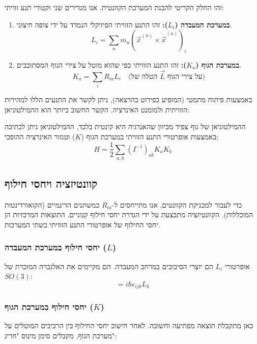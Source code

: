 זהו החלק הקריטי להבנת המערכת הקוונטית. אנו מגדירים שני וקטורי תנע זוויתי:

\begin{enumerate}
    \item \textbf{במערכת המעבדה ($L_i$):} זהו התנע הזוויתי הפיזיקלי הנמדד על ידי צופה חיצוני.
    \begin{equation}
        L_i = \sum_n m_n (\vec{x}^{(n)} \times \dot{\vec{x}}^{(n)})_i
    \end{equation}
    \item \textbf{במערכת הגוף ($K_a$):} זהו התנע הזוויתי כפי שהוא מוטל על צירי הגוף המסתובבים.
    \begin{equation}
        K_a = \sum_i R_{ia} L_i \quad \text{(הטלה של } \vec{L} \text{ על צירי הגוף)}
    \end{equation}
\end{enumerate}

באמצעות פיתוח מתמטי (המופיע בפירוט בהרצאה), ניתן לקשר את התנעים הללו למהירות הזוויתית ולמומנט האינרציה. הקשר החשוב ביותר הוא ההמילטוניאן:

\begin{resultbox}{ההמילטוניאן של גוף צפיד}
מכיוון שהאנרגיה היא קינטית בלבד, ההמילטוניאן ניתן לכתיבה באמצעות אופרטורי התנע הזוויתי במערכת הגוף ($K$) וטנזור האינרציה ההופכי:
\begin{equation}
    H = \frac{1}{2} \sum_{a,b} (I^{-1})_{ab} K_a K_b
\end{equation}
\end{resultbox}

\subsection{קוונטיזציה ויחסי חילוף}

כדי לעבור למכניקת הקוונטים, אנו מתייחסים ל-$R_{ia}$ כמשתנים הדינמיים (הקואורדינטות המוכללות). הקוונטיזציה מתבצעת על ידי הגדרת יחסי חילוף קנוניים. התוצאות המרכזיות הן יחסי החילוף של אופרטורי התנע הזוויתי בשתי המערכות.

\subsubsection{יחסי חילוף במערכת המעבדה ($L$)}
אופרטורי $L_i$ הם יוצרי הסיבובים במרחב המעבדה. הם מקיימים את האלגברה המוכרת של $SO(3)$:
\begin{equation}
    [L_i, L_j] = i\hbar \epsilon_{ijk} L_k
\end{equation}

\subsubsection{יחסי חילוף במערכת הגוף ($K$)}
כאן מתקבלת תוצאה מפתיעה וחשובה. לאחר חישוב יחסי החילוף בין הרכיבים המוטלים על מערכת הגוף, מקבלים סימן מינוס "חריג":

